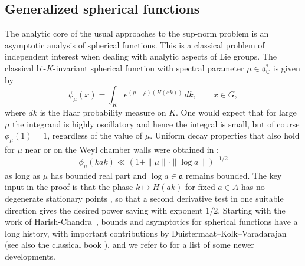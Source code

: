 \documentclass[11pt,oneside]{amsart}
\numberwithin{equation}{section}
\theoremstyle{remark}
\theoremstyle{plain}
\newcommand\CC{\mathbb{C}}
\newcommand\mfa{\mathfrak{a}}
\begin{document}
\subsection{Generalized spherical functions}\label{14}
The analytic core of the usual approaches to the sup-norm problem is an asymptotic analysis of spherical functions. This is a classical problem of independent interest when dealing with analytic aspects of Lie groups. The classical bi-$K$-invariant spherical function with spectral parameter $\mu \in \mfa_{\CC}^{\ast}$ is given by
\begin{equation}\label{spher}
\phi_{\mu}(x) = \int_K e^{(\mu-\rho)(H(xk))}\,dk,\qquad x\in G,
\end{equation}
where $dk$ is the Haar probability measure on $K$. One would expect that for large $\mu$ the integrand is highly oscillatory and hence the integral is small, but of course $\phi_{\mu}(1) = 1$, regardless of the value of $\mu$. Uniform decay properties that also hold for $\mu$ near or on the Weyl chamber walls were obtained in \cite{BP}:
\begin{equation}\label{BPbound}
\phi_{\mu}(kak) \ll (1 + \| \mu \| \cdot \| \log a \|)^{-1/2}
\end{equation}
as long as $\mu$ has bounded real part and $\log a \in \mfa$ remains bounded. The key input in the proof is that the phase $k \mapsto H(ak)$ for fixed $a \in A$ has no degenerate stationary points \cite[Cor.~1.5]{DKV}, so that a second derivative test in one suitable direction gives the desired power saving with exponent $1/2$. Starting with the work of Harish-Chandra~\cite{HC2,HC4}, bounds and asymptotics for spherical functions have a long history, with important contributions by Duistermaat--Kolk--Varadarajan~\cite{DKV} (see also the classical book \cite{MR954385}), and we refer to \cite{MR1870604, MR1873133, MR3144230, MR3506604, MR4297181, MR4931487, brumley2026quantumergodicitybenjaminischrammlimit} for a list of some newer developments.
\end{document}

